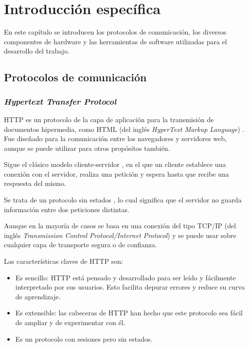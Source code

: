 \chapter{Introducción específica} %

\label{Chapter2}


En este capítulo se introducen los protocolos de comunicación, los diversos componentes de hardware y las herramientas de software utilizadas para el desarrollo del trabajo. 

\section{Protocolos de comunicación}

\subsection{\emph{Hypertext Transfer Protocol}}

HTTP es un protocolo de la capa de aplicación \citep{WEBSITE:CAPADEAPLICACION} para la transmisión de documentos hipermedia, como HTML (del inglés \textit{HyperText Markup Language}) \citep{WEBSITE:HTML}. Fue diseñado para la comunicación entre los navegadores y servidores web, aunque se puede utilizar para otros propósitos también. 

Sigue el clásico modelo cliente-servidor \citep{WEBSITE:CLIENTESERVIDOR}, en el que un cliente establece una conexión con el servidor, realiza una petición y espera hasta que recibe una respuesta del mismo. 

Se trata de un protocolo sin estados \citep{WEBSITE:PROTOCOLOSINESTADO}, lo cual significa que el servidor no guarda información entre dos peticiones distintas. 

Aunque en la mayoría de casos se basa en una conexión del tipo TCP/IP (del inglés \textit{Transmission Control Protocol/Internet Protocol}) \citep{WEBSITE:TCPIP} y se puede usar sobre cualquier capa de transporte \citep{WEBSITE:CAPADETRANSPORTE} segura o de confianza.

Las características claves de HTTP son:
\begin{itemize}
\item Es sencillo: HTTP está pensado y desarrollado para ser leído y fácilmente interpretado por sus usuarios. Esto facilita depurar errores y reduce su curva de aprendizaje.
\item Es extensible: las cabeceras de HTTP han hecho que este protocolo sea fácil de ampliar y de experimentar con él.
\item Es un protocolo con sesiones pero sin estados.
\end{itemize}

